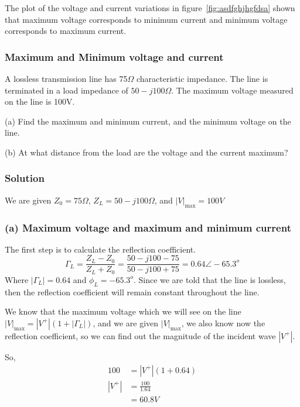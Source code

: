 The plot of the voltage and current variations in figure~\ref{fig:asdfghjhgfdsa} shown that maximum voltage corresponds to minimum current and minimum voltage corresponds to maximum current.

\begin{exmp}
\subsubsection*{Maximum and Minimum voltage and current}
A lossless transmission line has 75$\Omega$ characteristic impedance. The line is terminated in a load impedance of $50-j100\Omega$. The maximum voltage measured on the line is 100V.

(a) Find the maximum and minimum current, and the minimum voltage on the line.

(b) At what distance from the load are the voltage and the current maximum?

\subsubsection*{Solution}
We are given
$Z_{0}=75\Omega$,
$Z_{L}=50-j100\Omega$, and 
$|V|_\max=100V$

\subsubsection*{(a) Maximum voltage and maximum and minimum current}
The first step is to calculate the reflection coefficient.
\begin{dmath*}
\Gamma_{L}=\frac{Z_{L}-Z_{0}}{Z_{L}+Z_{0}}
=\frac{50-j100-75}{50-j100+75}
=0.64\angle-65.3^o 
\end{dmath*}
Where $|\Gamma_{L}|=0.64$ and $\phi_{L}=-65.3^o$. Since we are told that the line is lossless, then the reflection coefficient will remain constant throughout the line.

We know that the maximum voltage which we will see on the line $|V|_\max=|V^{+}|(1+|\Gamma_{L}|)$, and we are given $|V|_\max$, we also know now the reflection coefficient, so we can find out the magnitude of the incident wave $|V^+|$.

So,
\begin{align*}
100&=|V^{+}|(1+0.64)\\
|V^{+}|&=\frac{100}{1.64}\\
&=60.8V
\end{align*}


\end{exmp}
